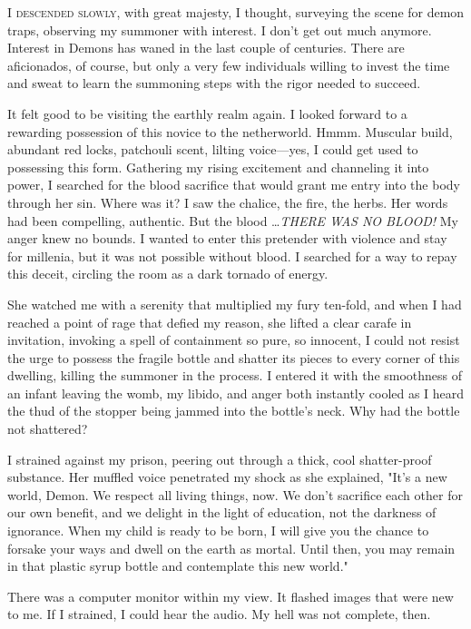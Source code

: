 
\lettrine{I}{ descended slowly,} with great majesty, I thought, surveying the scene
for demon traps, observing my summoner with interest. I don't get out
much anymore. Interest in Demons has waned in the last couple of
centuries. There are aficionados, of course, but only a very few
individuals willing to invest the time and sweat to learn the summoning
steps with the rigor needed to succeed.

It felt good to be visiting the earthly realm again. I looked forward to
a rewarding possession of this novice to the netherworld. Hmmm. Muscular
build, abundant red locks, patchouli scent, lilting voice---yes, I could
get used to possessing this form. Gathering my rising excitement and
channeling it into power, I searched for the blood sacrifice that would
grant me entry into the body through her sin. Where was it? I saw the
chalice, the fire, the herbs. Her words had been compelling, authentic.
But the blood \ldots \emph{THERE WAS NO BLOOD!} My anger knew no bounds. I
wanted to enter this pretender with violence and stay for millenia, but
it was not possible without blood. I searched for a way to repay this
deceit, circling the room as a dark tornado of energy.

She watched me with a serenity that multiplied my fury ten-fold, and
when I had reached a point of rage that defied my reason, she lifted a
clear carafe in invitation, invoking a spell of containment so pure, so
innocent, I could not resist the urge to possess the fragile bottle and
shatter its pieces to every corner of this dwelling, killing the
summoner in the process. I entered it with the smoothness of an infant
leaving the womb, my libido, and anger both instantly cooled as I heard
the thud of the stopper being jammed into the bottle's neck. Why had the
bottle not shattered?

I strained against my prison, peering out through a thick, cool
shatter-proof substance. Her muffled voice penetrated my shock as she
explained, "It's a new world, Demon. We respect all living things, now.
We don't sacrifice each other for our own benefit, and we delight in the
light of education, not the darkness of ignorance. When my child is
ready to be born, I will give you the chance to forsake your ways and
dwell on the earth as mortal. Until then, you may remain in that plastic
syrup bottle and contemplate this new world."

There was a computer monitor within my view. It flashed images that were
new to me. If I strained, I could hear the audio. My hell was not
complete, then.
